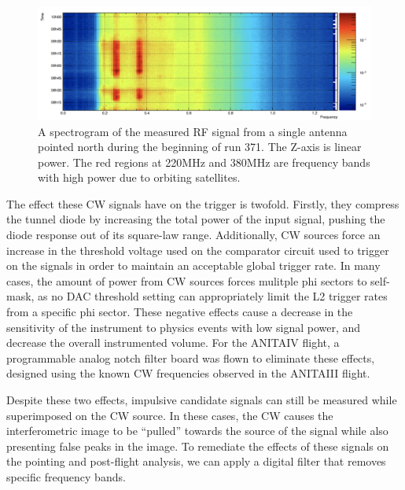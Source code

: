 \begin{figure}
	\centering
	\includegraphics[width=\textwidth]{figures/spectrogram}
	\caption{A spectrogram of the measured RF signal from a single antenna pointed north during the beginning of run 371.  The Z-axis is linear power.  The red regions at 220MHz and 380MHz are frequency bands with high power due to orbiting satellites.} 
	\label{fig:spectrogram}
\end{figure}

	The effect these CW signals have on the trigger is twofold.  Firstly, they compress the tunnel diode by increasing the total power of the input signal, pushing the diode response out of its square-law range.  Additionally, CW sources force an increase in the threshold voltage used on the comparator circuit used to trigger on the signals in order to maintain an acceptable global trigger rate.  In many cases, the amount of power from CW sources forces mulitple phi sectors to self-mask, as no DAC threshold setting can appropriately limit the L2 trigger rates from a specific phi sector.  These negative effects cause a decrease in the sensitivity of the instrument to physics events with low signal power, and decrease the overall instrumented volume.  For the ANITAIV flight, a programmable analog notch filter board was flown to eliminate these effects, designed using the known CW frequencies observed in the ANITAIII flight.

	
	Despite these two effects, impulsive candidate signals can still be measured while superimposed on the CW source.  In these cases, the CW causes the interferometric image to be ``pulled'' towards the source of the signal while also presenting false peaks in the image.  To remediate the effects of these signals on the pointing and post-flight analysis, we can apply a digital filter that removes specific frequency bands.
	
	
